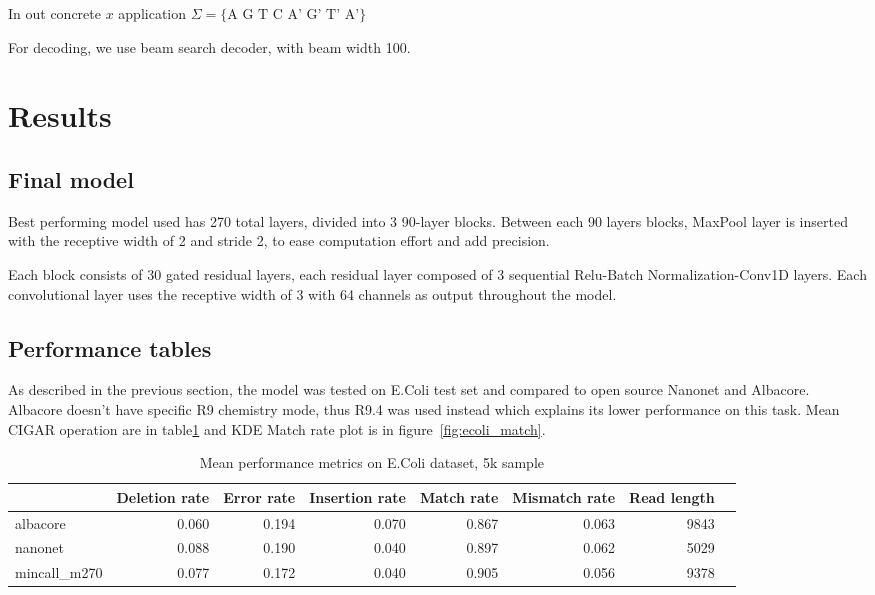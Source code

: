 \documentclass[runningheads,a4paper]{llncs}
\begin{document}
In out concrete $x$ application $\Sigma = \{\text{A G T C A' G' T' A'}\}$

For decoding, we use beam search decoder, with beam width 100.

\section{Results}

\subsection{Final model}

Best performing model used has 270 total layers, divided into 3 90-layer blocks. Between each 90 layers blocks, MaxPool layer is inserted with the receptive width of 2 and stride 2, to ease computation effort and add precision.

Each block consists of 30 gated residual layers, each residual layer composed of 3 sequential Relu-Batch Normalization-Conv1D layers. Each convolutional layer uses the receptive width of 3 with 64 channels as output throughout the model.

\subsection{Performance tables}

As described in the previous section, the model was tested on E.Coli test set and compared to open source Nanonet and Albacore. Albacore doesn't have specific R9 chemistry mode, thus R9.4 was used instead which explains its lower performance on this task. Mean CIGAR operation are in table\ref{table:1} and KDE Match rate plot is in figure~\ref{fig:ecoli_match}.


\begin{table}[h!]
\centering
\begin{tabular}{lrrrrrrr}
\toprule
{} &  Deletion rate &  Error rate &  Insertion rate &  Match rate &  Mismatch rate &  Read length\\
\midrule
albacore     &       0.060 &    0.194 &        0.070 &    0.867 &       0.063 &  9843 \\
nanonet      &       0.088 &    0.190 &        0.040 &    0.897 &       0.062 &  5029 \\
mincall\_m270 &       0.077 &    0.172 &        0.040 &   0.905 &       0.056 &  9378 \\
\bottomrule
\end{tabular}

\caption{Mean performance metrics on E.Coli dataset, 5k sample}
\label{table:1}
\end{table}
\end{document}

